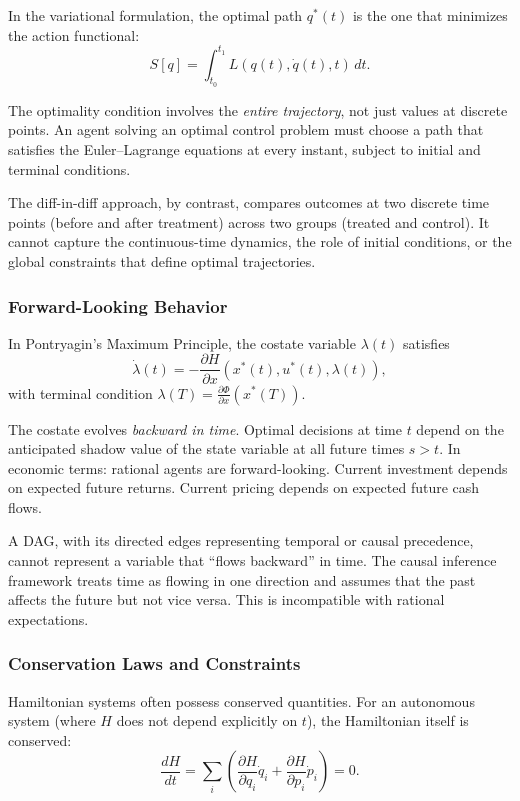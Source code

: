 \documentclass[12pt]{article}
\begin{document}
In the variational formulation, the optimal path $q^*(t)$ is the one that minimizes the action functional:
\[
S[q] = \int_{t_0}^{t_1} L(q(t), \dot{q}(t), t) \, dt.
\]

The optimality condition involves the \emph{entire trajectory}, not just values at discrete points. An agent solving an optimal control problem must choose a path that satisfies the Euler--Lagrange equations at every instant, subject to initial and terminal conditions.

The diff-in-diff approach, by contrast, compares outcomes at two discrete time points (before and after treatment) across two groups (treated and control). It cannot capture the continuous-time dynamics, the role of initial conditions, or the global constraints that define optimal trajectories.

\subsubsection{Forward-Looking Behavior}

In Pontryagin's Maximum Principle, the costate variable $\lambda(t)$ satisfies
\[
\dot{\lambda}(t) = -\frac{\partial H}{\partial x}(x^*(t), u^*(t), \lambda(t)),
\]
with terminal condition $\lambda(T) = \frac{\partial \Phi}{\partial x}(x^*(T))$.

The costate evolves \emph{backward in time}. Optimal decisions at time $t$ depend on the anticipated shadow value of the state variable at all future times $s > t$. In economic terms: rational agents are forward-looking. Current investment depends on expected future returns. Current pricing depends on expected future cash flows.

A DAG, with its directed edges representing temporal or causal precedence, cannot represent a variable that ``flows backward'' in time. The causal inference framework treats time as flowing in one direction and assumes that the past affects the future but not vice versa. This is incompatible with rational expectations.

\subsubsection{Conservation Laws and Constraints}

Hamiltonian systems often possess conserved quantities. For an autonomous system (where $H$ does not depend explicitly on $t$), the Hamiltonian itself is conserved:
\[
\frac{dH}{dt} = \sum_i \left( \frac{\partial H}{\partial q_i} \dot{q}_i + \frac{\partial H}{\partial p_i} \dot{p}_i \right) = 0.
\]
\end{document}
